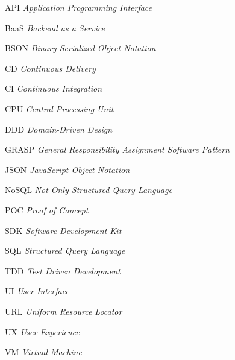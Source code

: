 \begin{siglas}
  \item[API] \textit{Application Programming Interface}
  \item[BaaS] \textit{Backend as a Service}
  \item[BSON] \textit{Binary Serialized Object Notation}
  \item[CD] \textit{Continuous Delivery}
  \item[CI] \textit{Continuous Integration}
  \item[CPU] \textit{Central Processing Unit}
  \item[DDD] \textit{Domain-Driven Design}
  \item[GRASP] \textit{General Responsibility Assignment Software Pattern}
  \item[JSON] \textit{JavaScript Object Notation}
  \item[NoSQL] \textit{Not Only Structured Query Language}
  \item[POC] \textit{Proof of Concept}
  \item[SDK] \textit{Software Development Kit}
  \item[SQL] \textit{Structured Query Language}
  \item[TDD] \textit{Test Driven Development}
  \item[UI] \textit{User Interface}
  \item[URL] \textit{Uniform Resource Locator}
  \item[UX] \textit{User Experience}
  \item[VM] \textit{Virtual Machine}
\end{siglas}
